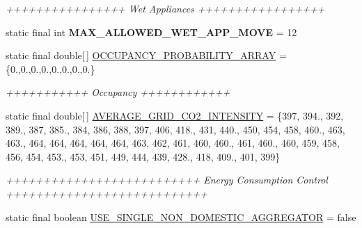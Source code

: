 \begin{DoxyCompactItemize}
\begin{DoxyCompactList}\small\item\em ++++++++++++++++ Wet Appliances +++++++++++++++++ \end{DoxyCompactList}\item 
\hypertarget{classuk_1_1ac_1_1dmu_1_1iesd_1_1cascade_1_1base_1_1_consts_a277c17f27ef17b3c4e16136fa67aca0d}{static final int {\bfseries M\-A\-X\-\_\-\-A\-L\-L\-O\-W\-E\-D\-\_\-\-W\-E\-T\-\_\-\-A\-P\-P\-\_\-\-M\-O\-V\-E} = 12}\label{classuk_1_1ac_1_1dmu_1_1iesd_1_1cascade_1_1base_1_1_consts_a277c17f27ef17b3c4e16136fa67aca0d}

\item 
\hypertarget{classuk_1_1ac_1_1dmu_1_1iesd_1_1cascade_1_1base_1_1_consts_a8da1aba05a372945388dfbe4e17fee89}{static final double\mbox{[}$\,$\mbox{]} \hyperlink{classuk_1_1ac_1_1dmu_1_1iesd_1_1cascade_1_1base_1_1_consts_a8da1aba05a372945388dfbe4e17fee89}{O\-C\-C\-U\-P\-A\-N\-C\-Y\-\_\-\-P\-R\-O\-B\-A\-B\-I\-L\-I\-T\-Y\-\_\-\-A\-R\-R\-A\-Y} = \{0.,0.,0.,0.,0.,0.,0.,0.\}}\label{classuk_1_1ac_1_1dmu_1_1iesd_1_1cascade_1_1base_1_1_consts_a8da1aba05a372945388dfbe4e17fee89}

\begin{DoxyCompactList}\small\item\em +++++++++++ Occupancy ++++++++++++ \end{DoxyCompactList}\item 
\hypertarget{classuk_1_1ac_1_1dmu_1_1iesd_1_1cascade_1_1base_1_1_consts_a07b528c1474ae6e937e9900a3251980b}{static final double\mbox{[}$\,$\mbox{]} \hyperlink{classuk_1_1ac_1_1dmu_1_1iesd_1_1cascade_1_1base_1_1_consts_a07b528c1474ae6e937e9900a3251980b}{A\-V\-E\-R\-A\-G\-E\-\_\-\-G\-R\-I\-D\-\_\-\-C\-O2\-\_\-\-I\-N\-T\-E\-N\-S\-I\-T\-Y} = \{397, 394., 392, 389., 387, 385., 384, 386, 388, 397, 406, 418., 431, 440., 450, 454, 458, 460., 463, 463., 464, 464, 464, 464, 464, 463, 462, 461, 460, 460., 461, 460., 460, 459, 458, 456, 454, 453., 453, 451, 449, 444, 439, 428., 418, 409., 401, 399\}}\label{classuk_1_1ac_1_1dmu_1_1iesd_1_1cascade_1_1base_1_1_consts_a07b528c1474ae6e937e9900a3251980b}

\begin{DoxyCompactList}\small\item\em ++++++++++++++++++++++++++ Energy Consumption Control +++++++++++++++++++++++++++ \end{DoxyCompactList}\item 
\hypertarget{classuk_1_1ac_1_1dmu_1_1iesd_1_1cascade_1_1base_1_1_consts_a901542b4d26e89ddafd432c7e118a95b}{static final boolean \hyperlink{classuk_1_1ac_1_1dmu_1_1iesd_1_1cascade_1_1base_1_1_consts_a901542b4d26e89ddafd432c7e118a95b}{U\-S\-E\-\_\-\-S\-I\-N\-G\-L\-E\-\_\-\-N\-O\-N\-\_\-\-D\-O\-M\-E\-S\-T\-I\-C\-\_\-\-A\-G\-G\-R\-E\-G\-A\-T\-O\-R} = false}\label{classuk_1_1ac_1_1dmu_1_1iesd_1_1cascade_1_1base_1_1_consts_a901542b4d26e89ddafd432c7e118a95b}


\end{DoxyCompactItemize}

